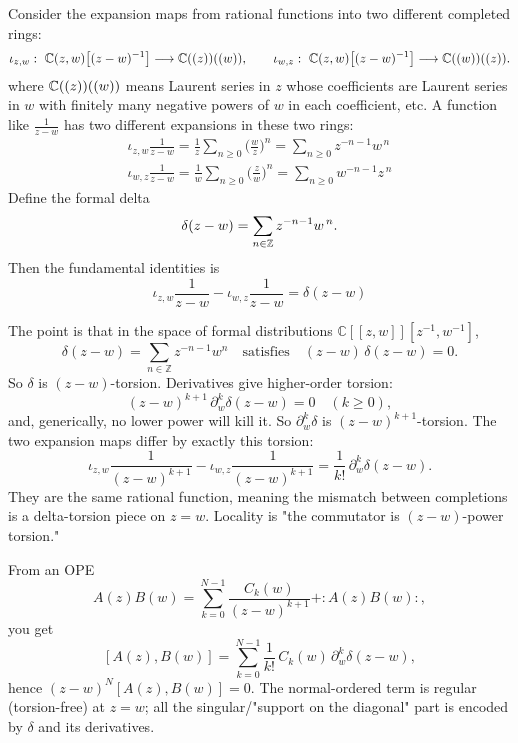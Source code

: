 \documentclass[12pt]{article}
\begin{document}
\begin{remark}
     Consider the expansion maps from rational functions into two different completed rings:
    \[
        \iota_{z,w}:\ \C(z,w)\!\left[(z-w)^{-1}\right]\longrightarrow \C((z))((w)),
        \qquad
        \iota_{w,z}:\ \C(z,w)\!\left[(z-w)^{-1}\right]\longrightarrow \C((w))((z)).
    \] where \( \mathbb{C}((z))((w)) \) means Laurent series in $z$ whose coefficients are Laurent series in $w$ with finitely many negative powers of $w$ in each coefficient, etc. A function like \( \frac{1}{z-w} \) has two different expansions in these two rings: \begin{align*}
        \iota_{z,w}\frac{1}{z-w}
        = \frac{1}{z}\sum_{n\ge0}\Big(\frac{w}{z}\Big)^n
        = \sum_{n\ge0} z^{-n-1} w^{\,n} \\
        \iota_{w,z}\frac{1}{z-w}
        = \frac{1}{w}\sum_{n\ge0}\Big(\frac{z}{w}\Big)^n
        = \sum_{n\ge0} w^{-n-1} z^{\,n}
    \end{align*}
    Define the formal delta
    \[
        \delta(z-w)=\sum_{n\in\mathbb{Z}} z^{-n-1}w^{\,n}.
    \]
    Then the fundamental identities is
    \[
        \iota_{z,w}\frac{1}{z-w}-\iota_{w,z}\frac{1}{z-w}= \delta(z-w)
    \]
\end{remark}
The point is that in the space of formal distributions $\mathbb{C}[[z,w]][z^{-1},w^{-1}]$,
\[
    \delta(z-w)=\sum_{n\in\mathbb{Z}} z^{-n-1}w^n
    \quad\text{satisfies}\quad
    (z-w)\,\delta(z-w)=0.
\]
So $\delta$ is $(z-w)$-torsion. Derivatives give higher-order torsion:
\[
    (z-w)^{k+1}\,\partial_w^k\delta(z-w)=0\quad(k\ge0),
\]
and, generically, no lower power will kill it. So $\partial_w^k\delta$ is $(z-w)^{k+1}$-torsion. The two expansion maps differ by exactly this torsion:
\[
    \iota_{z,w}\frac{1}{(z-w)^{k+1}}-\iota_{w,z}\frac{1}{(z-w)^{k+1}}
    =\frac{1}{k!}\,\partial_w^k\delta(z-w).
\]
They are the same rational function, meaning the mismatch between completions is a delta-torsion piece on $z=w$. Locality is "the commutator is $(z-w)$-power torsion."

From an OPE
\[
    A(z)B(w)=\sum_{k=0}^{N-1}\frac{C_k(w)}{(z-w)^{k+1}}+ :A(z)B(w):,
\]
you get
\[
    [A(z),B(w)]=\sum_{k=0}^{N-1}\frac{1}{k!}\,C_k(w)\,\partial_w^k\delta(z-w),
\]
hence $(z-w)^N[A(z),B(w)]=0$. The normal-ordered term is regular (torsion-free) at $z=w$; all the singular/"support on the diagonal" part is encoded by $\delta$ and its derivatives.
\end{document}
